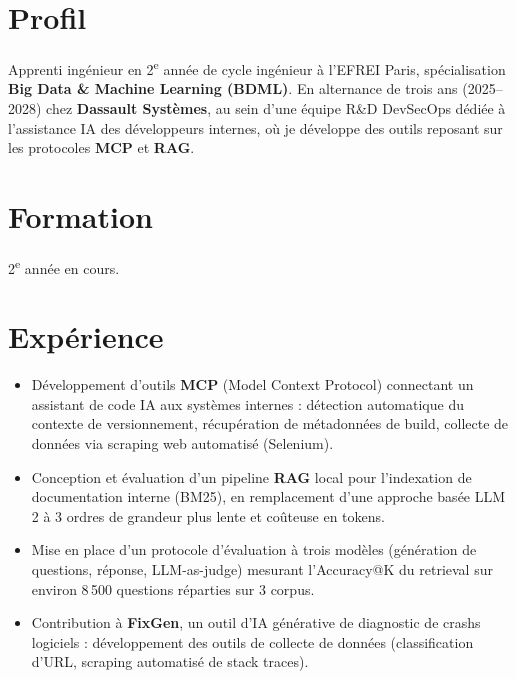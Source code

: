 \documentclass[9.5pt]{article}
\begin{document}
\noindent
\begin{minipage}[t]{0.645\textwidth}

\section*{\large\bfseries\color{accent}Profil}
\vspace{-2pt}
\noindent\small
Apprenti ingénieur en 2\textsuperscript{e} année de cycle ingénieur à l'EFREI Paris, spécialisation \textbf{Big Data \& Machine Learning (BDML)}. En alternance de trois ans (2025--2028) chez \textbf{Dassault Systèmes}, au sein d'une équipe R\&D DevSecOps dédiée à l'assistance IA des développeurs internes, où je développe des outils reposant sur les protocoles \textbf{MCP} et \textbf{RAG}.

\section*{\large\bfseries\color{accent}Formation}
\vspace{-2pt}
{\small 2\textsuperscript{e} année en cours.}

\vspace{2pt}

\vspace{2pt}

\section*{\large\bfseries\color{accent}Expérience}
\vspace{-2pt}
\begin{itemize}\small
  \item Développement d'outils \textbf{MCP} (Model Context Protocol) connectant un assistant de code IA aux systèmes internes : détection automatique du contexte de versionnement, récupération de métadonnées de build, collecte de données via scraping web automatisé (Selenium).
  \item Conception et évaluation d'un pipeline \textbf{RAG} local pour l'indexation de documentation interne (BM25), en remplacement d'une approche basée LLM 2 à 3 ordres de grandeur plus lente et coûteuse en tokens.
  \item Mise en place d'un protocole d'évaluation à trois modèles (génération de questions, réponse, LLM-as-judge) mesurant l'Accuracy@K du retrieval sur environ 8\,500 questions réparties sur 3 corpus.
  \item Contribution à \textbf{FixGen}, un outil d'IA générative de diagnostic de crashs logiciels : développement des outils de collecte de données (classification d'URL, scraping automatisé de stack traces).
\end{itemize}


\end{minipage}
\end{document}
